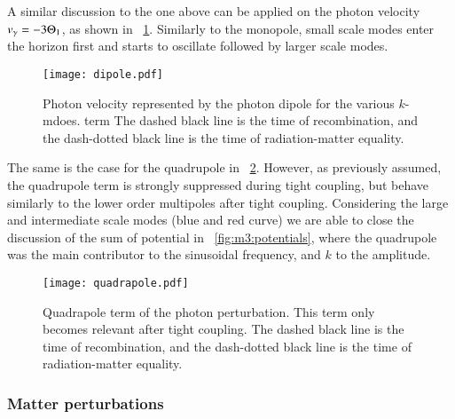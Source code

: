     A similar discussion to the one above can be applied on the photon velocity $v_\gamma = -3\Theta_1$, as shown in ~\cref{fig:m3:dipole}. Similarly to the monopole, small scale modes enter the horizon first and starts to oscillate followed by larger scale modes. 

    \begin{figure}
        \texttt{[image: dipole.pdf]}
        \caption{Photon velocity represented by the photon dipole for the various $k$-mdoes. term The dashed black line is the time of recombination, and the dash-dotted black line is the time of radiation-matter equality.}
        \label{fig:m3:dipole}
    \end{figure}

    The same is the case for the quadrupole in ~\cref{fig:m3:quadrapole}. However, as previously assumed, the quadrupole term is strongly suppressed during tight coupling, but behave similarly to the lower order multipoles after tight coupling. Considering the large and intermediate scale modes (blue and red curve) we are able to close the discussion of the sum of potential in ~\cref{fig:m3:potentials}, where the quadrupole was the main contributor to the sinusoidal frequency, and $k$ to the amplitude. 

    \begin{figure}
        \texttt{[image: quadrapole.pdf]}
        \caption{Quadrapole term of the photon perturbation. This term only becomes relevant after tight coupling. The dashed black line is the time of recombination, and the dash-dotted black line is the time of radiation-matter equality.}
        \label{fig:m3:quadrapole}
    \end{figure}

\subsubsection{Matter perturbations}

